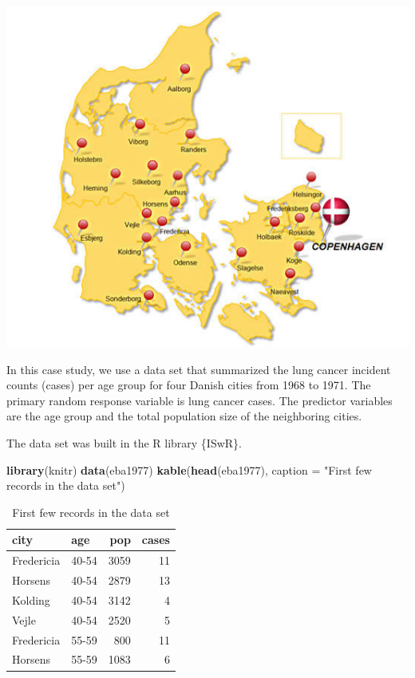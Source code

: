 \documentclass[
]{book}
\newenvironment{Shaded}{\begin{snugshade}}{\end{snugshade}}
\newcommand{\AttributeTok}[1]{\textcolor[rgb]{0.13,0.29,0.53}{#1}}
\newcommand{\FunctionTok}[1]{\textcolor[rgb]{0.13,0.29,0.53}{\textbf{#1}}}
\newcommand{\NormalTok}[1]{#1}
\newcommand{\StringTok}[1]{\textcolor[rgb]{0.31,0.60,0.02}{#1}}
\begin{document}
\begin{center}\includegraphics[width=0.6\linewidth]{img10/DenmarkCitiesMap} \end{center}

In this case study, we use a data set that summarized the lung cancer incident counts (cases) per age group for four Danish cities from 1968 to 1971. The primary random response variable is lung cancer cases. The predictor variables are the age group and the total population size of the neighboring cities.

The data set was built in the R library \{ISwR\}.

\begin{Shaded}
\begin{Highlighting}[]
\FunctionTok{library}\NormalTok{(knitr)}
\FunctionTok{data}\NormalTok{(eba1977)}
\FunctionTok{kable}\NormalTok{(}\FunctionTok{head}\NormalTok{(eba1977), }\AttributeTok{caption =} \StringTok{"First few records in the data set"}\NormalTok{) }
\end{Highlighting}
\end{Shaded}

\begin{table}

\caption{\label{tab:unnamed-chunk-170}First few records in the data set}
\centering
\begin{tabular}[t]{l|l|r|r}
\hline
city & age & pop & cases\\
\hline
Fredericia & 40-54 & 3059 & 11\\
\hline
Horsens & 40-54 & 2879 & 13\\
\hline
Kolding & 40-54 & 3142 & 4\\
\hline
Vejle & 40-54 & 2520 & 5\\
\hline
Fredericia & 55-59 & 800 & 11\\
\hline
Horsens & 55-59 & 1083 & 6\\
\hline
\end{tabular}
\end{table}
\end{document}
